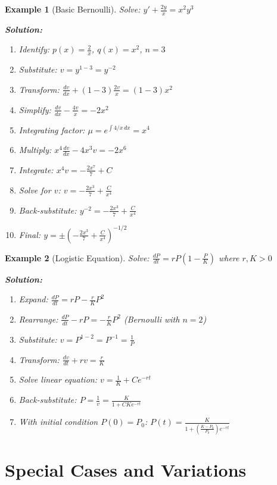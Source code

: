 \documentclass[12pt]{article}
\newtheorem{example}{Example}
\begin{document}
\begin{example}[Basic Bernoulli]
Solve: $y' + \frac{2y}{x} = x^2y^3$

\textbf{Solution:}
\begin{enumerate}
    \item Identify: $p(x) = \frac{2}{x}$, $q(x) = x^2$, $n = 3$
    \item Substitute: $v = y^{1-3} = y^{-2}$
    \item Transform: $\frac{dv}{dx} + (1-3)\frac{2v}{x} = (1-3)x^2$
    \item Simplify: $\frac{dv}{dx} - \frac{4v}{x} = -2x^2$
    \item Integrating factor: $\mu = e^{\int 4/x \, dx} = x^4$
    \item Multiply: $x^4\frac{dv}{dx} - 4x^3v = -2x^6$
    \item Integrate: $x^4v = -\frac{2x^7}{7} + C$
    \item Solve for $v$: $v = -\frac{2x^3}{7} + \frac{C}{x^4}$
    \item Back-substitute: $y^{-2} = -\frac{2x^3}{7} + \frac{C}{x^4}$
    \item Final: $y = \pm\left(-\frac{2x^3}{7} + \frac{C}{x^4}\right)^{-1/2}$
\end{enumerate}
\end{example}

\begin{example}[Logistic Equation]
Solve: $\frac{dP}{dt} = rP\left(1 - \frac{P}{K}\right)$ where $r, K > 0$

\textbf{Solution:}
\begin{enumerate}
    \item Expand: $\frac{dP}{dt} = rP - \frac{r}{K}P^2$
    \item Rearrange: $\frac{dP}{dt} - rP = -\frac{r}{K}P^2$ (Bernoulli with $n = 2$)
    \item Substitute: $v = P^{1-2} = P^{-1} = \frac{1}{P}$
    \item Transform: $\frac{dv}{dt} + rv = \frac{r}{K}$
    \item Solve linear equation: $v = \frac{1}{K} + Ce^{-rt}$
    \item Back-substitute: $P = \frac{1}{v} = \frac{K}{1 + CKe^{-rt}}$
    \item With initial condition $P(0) = P_0$: $P(t) = \frac{K}{1 + \left(\frac{K - P_0}{P_0}\right)e^{-rt}}$
\end{enumerate}
\end{example}

\section{Special Cases and Variations}
\end{document}
